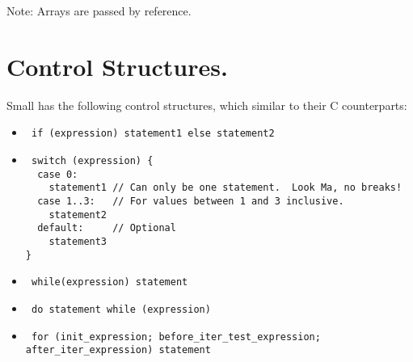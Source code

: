 \begin{Desc}
\item[Note:]Arrays are passed by reference.\end{Desc}
\hypertarget{Small_Page_Small_Control_Subsection}{}\section{Control Structures.}\label{Small_Page_Small_Control_Subsection}
Small has the following control structures, which similar to their C counterparts: \begin{itemize}
\item 

\begin{Code}\begin{verbatim} if (expression) statement1 else statement2 
\end{verbatim}
\end{Code}

 \item 

\begin{Code}\begin{verbatim} switch (expression) {
  case 0:
    statement1 // Can only be one statement.  Look Ma, no breaks!
  case 1..3:   // For values between 1 and 3 inclusive.
    statement2
  default:     // Optional
    statement3
}
\end{verbatim}
\end{Code}

 \item 

\begin{Code}\begin{verbatim} while(expression) statement 
\end{verbatim}
\end{Code}

 \item 

\begin{Code}\begin{verbatim} do statement while (expression) 
\end{verbatim}
\end{Code}

 \item 

\begin{Code}\begin{verbatim} for (init_expression; before_iter_test_expression; after_iter_expression) statement 
\end{verbatim}
\end{Code}

\end{itemize}
